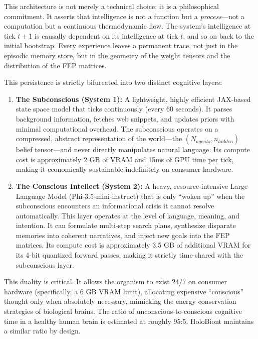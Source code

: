 This architecture is not merely a technical choice; it is a philosophical commitment. It asserts that intelligence is not a function but a \textit{process}---not a computation but a continuous thermodynamic flow. The system's intelligence at tick $t+1$ is causally dependent on its intelligence at tick $t$, and so on back to the initial bootstrap. Every experience leaves a permanent trace, not just in the episodic memory store, but in the geometry of the weight tensors and the distribution of the FEP matrices.

This persistence is strictly bifurcated into two distinct cognitive layers:

\begin{enumerate}
    \item \textbf{The Subconscious (System 1):} A lightweight, highly efficient JAX-based state space model that ticks continuously (every 60 seconds). It parses background information, fetches web snippets, and updates priors with minimal computational overhead. The subconscious operates on a compressed, abstract representation of the world---the $(N_{agents}, n_{hidden})$ belief tensor---and never directly manipulates natural language. Its compute cost is approximately 2 GB of VRAM and 15ms of GPU time per tick, making it economically sustainable indefinitely on consumer hardware.

    \item \textbf{The Conscious Intellect (System 2):} A heavy, resource-intensive Large Language Model (Phi-3.5-mini-instruct) that is only ``woken up'' when the subconscious encounters an informational crisis it cannot resolve automatically. This layer operates at the level of language, meaning, and intention. It can formulate multi-step search plans, synthesize disparate memories into coherent narratives, and inject new goals into the FEP matrices. Its compute cost is approximately 3.5 GB of additional VRAM for its 4-bit quantized forward passes, making it strictly time-shared with the subconscious layer.
\end{enumerate}

This duality is critical. It allows the organism to exist 24/7 on consumer hardware (specifically, a 6 GB VRAM limit), allocating expensive ``conscious'' thought only when absolutely necessary, mimicking the energy conservation strategies of biological brains. The ratio of unconscious-to-conscious cognitive time in a healthy human brain is estimated at roughly 95:5. HoloBiont maintains a similar ratio by design.

